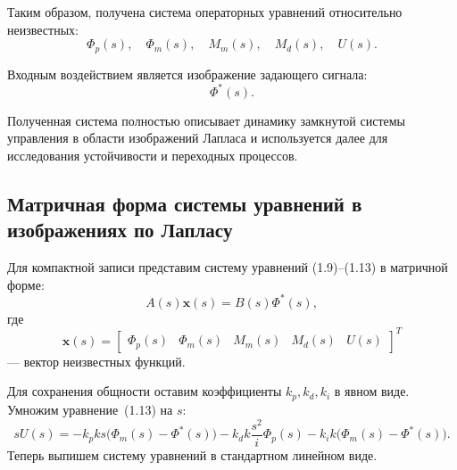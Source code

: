 \documentclass[a4paper, 14pt]{extarticle}
\begin{document}
Таким образом, получена система операторных уравнений относительно неизвестных:
\[
    \Phi_p(s),\quad
    \Phi_m(s),\quad
    M_m(s),\quad
    M_d(s),\quad
    U(s).
\]

Входным воздействием является изображение задающего сигнала:
\[
    \Phi^*(s).
\]

Полученная система полностью описывает динамику замкнутой системы управления в области изображений Лапласа и используется далее для исследования устойчивости и переходных процессов.

\subsection{Матричная форма системы уравнений в изображениях по Лапласу}

Для компактной записи представим систему уравнений (1.9)–(1.13) в матричной форме:
\[
    A(s)\mathbf{x}(s)=B(s)\Phi^*(s),
\]
где
\[
    \mathbf{x}(s)=
    \begin{bmatrix}
        \Phi_p(s) &
        \Phi_m(s) &
        M_m(s)    &
        M_d(s)    &
        U(s)
    \end{bmatrix}^{T}
\]
— вектор неизвестных функций.

Для сохранения общности оставим коэффициенты \(k_p, k_d, k_i\)
в явном виде. Умножим уравнение~(1.13) на \(s\):
\[
    sU(s)=
    -k_p k s\bigl(\Phi_m(s)-\Phi^*(s)\bigr)
    -k_d k \frac{s^2}{i}\Phi_p(s)
    -k_i k\bigl(\Phi_m(s)-\Phi^*(s)\bigr).
    \tag{1.13a}
\]
Теперь выпишем систему уравнений в стандартном линейном виде.
\end{document}
